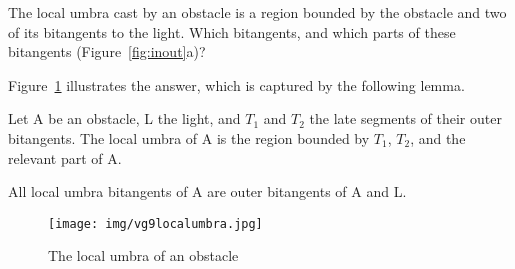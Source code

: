 \documentclass[9pt]{article}
\newif\ifJournal
\newif\ifTalk
\begin{document}
The local umbra cast by an obstacle is a region bounded by the obstacle
and two of its bitangents to the light.
Which bitangents, and which parts of these bitangents (Figure~\ref{fig:inout}a)?
\ifTalk
We are looking for bitangents that do not intersect the obstacle or light.
However, we must relax our constraints when the obstacle surrounds the light.
\fi
Figure~\ref{fig:G2} illustrates the answer, which is captured by the following lemma.



\begin{theorem}
\label{thm:localumbra}
Let A be an obstacle, L the light, and
$T_1$ and $T_2$ the late segments of their outer bitangents.
The local umbra of A is the region bounded by $T_1$, $T_2$, 
and the relevant part of A.
\end{theorem}
\ifJournal
\prf
Every other part of A sees some of L.
Argue that the light becomes visible as you cross these bitangents.
\QED
\fi

\begin{corollary}
All local umbra bitangents of A are outer bitangents of A and L.
\end{corollary}

\begin{figure}[h]
\begin{center}
\texttt{[image: img/vg9localumbra.jpg]}
\end{center}
\caption{The local umbra of an obstacle}
\label{fig:G2}
\end{figure}


\ifJournal
\vspace{.1in}
\end{document}
